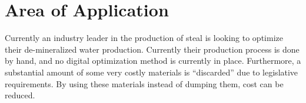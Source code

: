 \section{Area of Application}

Currently an industry leader in the production of steal is looking to optimize their de-mineralized water production. Currently their production process is done by hand, and no digital optimization method is currently in place. Furthermore, a substantial amount of some very costly materials is ``discarded'' due to legislative requirements. By using these materials instead of dumping them, cost can be reduced.


